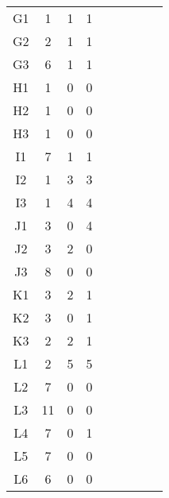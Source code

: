 \begin{center}
\begin{longtable}{ccccc|cccc}
G1    & 1     & 1     & 1 \\
G2    & 2     & 1     & 1 \\
G3    & 6     & 1     & 1 \\
H1    & 1     & 0     & 0 \\
H2    & 1     & 0     & 0 \\
H3    & 1     & 0     & 0 \\
I1    & 7     & 1     & 1 \\
I2    & 1     & 3     & 3 \\
I3    & 1     & 4     & 4 \\
J1    & 3     & 0     & 4 \\
J2    & 3     & 2     & 0 \\
J3    & 8     & 0     & 0 \\
K1    & 3     & 2     & 1 \\
K2    & 3     & 0     & 1 \\
K3    & 2     & 2     & 1 \\
L1    & 2     & 5     & 5 \\
L2    & 7     & 0     & 0 \\
L3    & 11    & 0     & 0 \\
L4    & 7     & 0     & 1 \\
L5    & 7     & 0     & 0 \\
L6    & 6     & 0     & 0 \\

\end{longtable}
\end{center}

